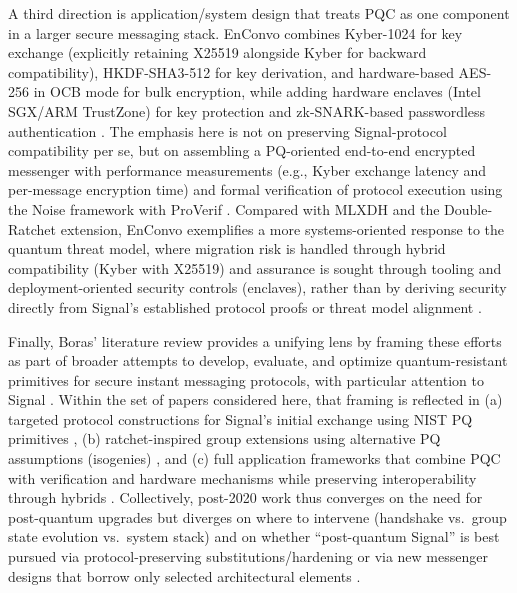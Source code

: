 A third direction is application/system design that treats PQC as one component in a larger secure messaging stack. EnConvo combines Kyber-1024 for key exchange (explicitly retaining X25519 alongside Kyber for backward compatibility), HKDF-SHA3-512 for key derivation, and hardware-based AES-256 in OCB mode for bulk encryption, while adding hardware enclaves (Intel SGX/ARM TrustZone) for key protection and zk-SNARK-based passwordless authentication \cite{r2025}. The emphasis here is not on preserving Signal-protocol compatibility per se, but on assembling a PQ-oriented end-to-end encrypted messenger with performance measurements (e.g., Kyber exchange latency and per-message encryption time) and formal verification of protocol execution using the Noise framework with ProVerif \cite{r2025}. Compared with MLXDH and the Double-Ratchet extension, EnConvo exemplifies a more systems-oriented response to the quantum threat model, where migration risk is handled through hybrid compatibility (Kyber with X25519) and assurance is sought through tooling and deployment-oriented security controls (enclaves), rather than by deriving security directly from Signal’s established protocol proofs or threat model alignment \cite{r2025,angom2025,bobrysheva2021}.

Finally, Boras’ literature review provides a unifying lens by framing these efforts as part of broader attempts to develop, evaluate, and optimize quantum-resistant primitives for secure instant messaging protocols, with particular attention to Signal \cite{boras2025}. Within the set of papers considered here, that framing is reflected in (a) targeted protocol constructions for Signal’s initial exchange using NIST PQ primitives \cite{angom2025}, (b) ratchet-inspired group extensions using alternative PQ assumptions (isogenies) \cite{bobrysheva2021}, and (c) full application frameworks that combine PQC with verification and hardware mechanisms while preserving interoperability through hybrids \cite{r2025}. Collectively, post-2020 work thus converges on the need for post-quantum upgrades but diverges on where to intervene (handshake vs.\ group state evolution vs.\ system stack) and on whether “post-quantum Signal” is best pursued via protocol-preserving substitutions/hardening or via new messenger designs that borrow only selected architectural elements \cite{boras2025,angom2025,bobrysheva2021,r2025,sharma2023}.

